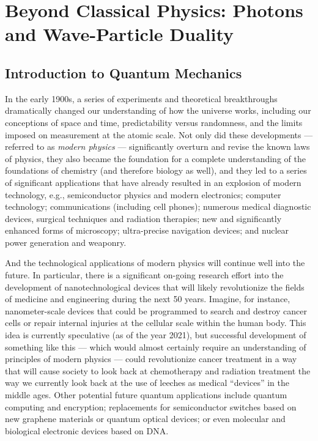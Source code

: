 \chapter[Beyond Classical Physics]{Beyond Classical Physics: Photons
and Wave-Particle Duality}
\label{chapter:beyond_classical}

\section{Introduction to Quantum Mechanics}
\label{sec:beyond_classical_intro}

In the early 1900s, a series of experiments and theoretical breakthroughs
dramatically changed our understanding of how the universe works,
including our conceptions of space and time, predictability versus
randomness, and the limits imposed on measurement at the atomic scale.
Not only did these developments --- referred to as {\it modern physics}
--- significantly overturn and revise the known laws of physics, they also
became the foundation for a complete understanding of the foundations of
chemistry (and therefore biology as well), and they led to a series of
significant applications that have already resulted in  an explosion of
modern technology, e.g., semiconductor physics and modern electronics;
computer technology; communications (including cell phones); numerous
medical diagnostic devices, surgical techniques and radiation therapies;
new and significantly enhanced forms of microscopy; ultra-precise
navigation devices; and nuclear power generation and weaponry.

And the technological applications of modern physics will continue well
into the future. In particular, there is a significant on-going research
effort into the development of nanotechnological devices that will likely
revolutionize the fields of medicine and engineering during the next
50 years.  Imagine, for instance, nanometer-scale devices that could be
programmed to search and destroy cancer cells or repair internal injuries
at the cellular scale within the human body. This idea is currently
speculative (as of the year 2021), but successful development of something
like this --- which would almost certainly require an understanding of
principles of modern physics --- could revolutionize cancer treatment in
a way that will cause society to look back at chemotherapy and radiation
treatment the way we currently look back at the use of leeches as
medical ``devices'' in the middle ages. Other potential future quantum
applications include quantum computing and encryption; replacements for
semiconductor switches based on new graphene materials or quantum optical
devices; or even molecular and biological electronic devices based on DNA.

